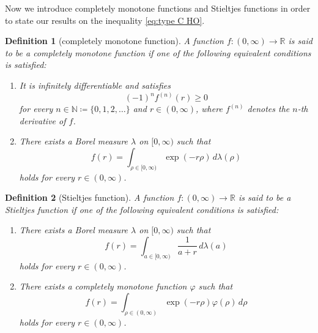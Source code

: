 \documentclass[reqno]{amsart}
\theoremstyle{plain}
\newtheorem*{definition*}{Definition}
\numberwithin{equation}{section}
\theoremstyle{remark}
\newcommand{\R}{\mathbb{R}}
\newcommand{\N}{\mathbb{N}}
\newcommand{\intervaloo}[2]{(#1, #2)}
\newcommand{\intervalco}[2]{[#1, #2)}
\begin{document}
Now we introduce completely monotone functions and Stieltjes functions in order to state our results on the inequality \eqref{eq:type C HO}.
	\begin{definition*}[completely monotone function]
	A function $f \colon \intervaloo{0}{\infty} \to \R$ is said to be a completely monotone function if one of the following equivalent conditions is satisfied:
	\begin{enumerate}[label=\textup{(CM\arabic*)}]
		\item \label{item:completely monotone 1}
		It is infinitely differentiable and
		satisfies
		\begin{equation}
			(-1)^n f^{(n)}(r) \geq 0
		\end{equation}
		for every $n \in \N \coloneqq \{ 0, 1, 2, \ldots \}$ and $r \in \intervaloo{0}{\infty}$, where $f^{(n)}$ denotes the $n$-th derivative of $f$.
		\item \label{item:completely monotone 2}
		There exists a Borel measure $\lambda$ on $\intervalco{0}{\infty}$ such that
		\begin{equation}
			f(r) = \int_{\rho \in \intervalco{0}{\infty}} \exp(-r \rho) \, d\lambda(\rho)
		\end{equation}
		holds for every $r \in \intervaloo{0}{\infty}$.
	\end{enumerate} 
\end{definition*}
\begin{definition*}[Stieltjes function]
	A function $f \colon \intervaloo{0}{\infty} \to \R$ is said to be a Stieltjes function if one of the following equivalent conditions is satisfied:
	\begin{enumerate}[label=\textup{(S\arabic*)}]
		\item \label{item:Stieltjes 1}
		There exists a Borel measure $\lambda$ on $\intervalco{0}{\infty}$ such that
		\begin{equation}
			f(r) = \int_{a \in \intervalco{0}{\infty}} \frac{1}{a+r} \, d\lambda(a)
		\end{equation}
		holds for every $r \in \intervaloo{0}{\infty}$.
		\item \label{item:Stieltjes 2}
		There exists a completely monotone function $\varphi$ such that
		\begin{equation}
			f(r) = \int_{\rho \in \intervaloo{0}{\infty}} \exp(-r \rho) \varphi(\rho) \, d\rho
		\end{equation}
		holds for every $r \in \intervaloo{0}{\infty}$.
	\end{enumerate}
\end{definition*}
\end{document}
